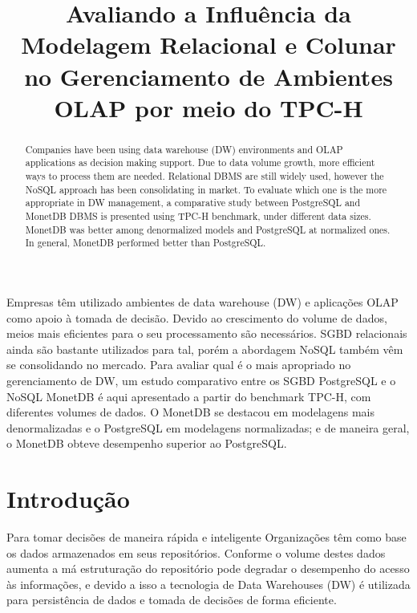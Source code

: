 \documentclass[12pt]{article}
\begin{document}
 

\title{Avaliando a Influência da Modelagem Relacional e Colunar no Gerenciamento de Ambientes OLAP por meio do TPC-H}
\author{}
\address{}

\maketitle

\begin{abstract}

Companies have been using data warehouse (DW) environments and OLAP applications 
as decision making support. Due to data volume growth, more efficient ways to 
process them are needed. Relational DBMS are still widely used, however the NoSQL 
approach has been consolidating in market. To evaluate which one is the more appropriate 
in DW management, a comparative study between PostgreSQL and MonetDB DBMS is presented 
using TPC-H benchmark, under different data sizes. MonetDB was better among 
denormalized models and PostgreSQL at normalized ones. In general, MonetDB performed 
better than PostgreSQL.

\end{abstract}
     
\begin{resumo}
Empresas têm utilizado ambientes de data warehouse (DW) 
e aplicações OLAP como apoio à tomada de decisão. 
Devido ao crescimento do volume de dados, meios mais eficientes para o seu processamento 
são necessários. SGBD relacionais ainda são bastante utilizados para tal, 
porém a abordagem NoSQL também vêm se consolidando no mercado. 
Para avaliar qual é o mais apropriado no gerenciamento de DW, um estudo comparativo entre 
os SGBD PostgreSQL e o NoSQL MonetDB é aqui apresentado a 
partir do benchmark TPC-H, com diferentes volumes de dados. O MonetDB se 
destacou em modelagens mais denormalizadas e o PostgreSQL em modelagens normalizadas; e de maneira geral, 
o MonetDB obteve desempenho superior ao PostgreSQL.    
\end{resumo}

\section{Introdução}
Para tomar decisões de maneira rápida e inteligente Organizações têm como base os dados armazenados em seus repositórios.
Conforme o volume destes dados aumenta a má estruturação do repositório pode degradar o desempenho do acesso às informações,
e devido a isso a tecnologia de Data Warehouses (DW) é utilizada para persistência de dados e tomada de decisões de forma eficiente.
\end{document}
